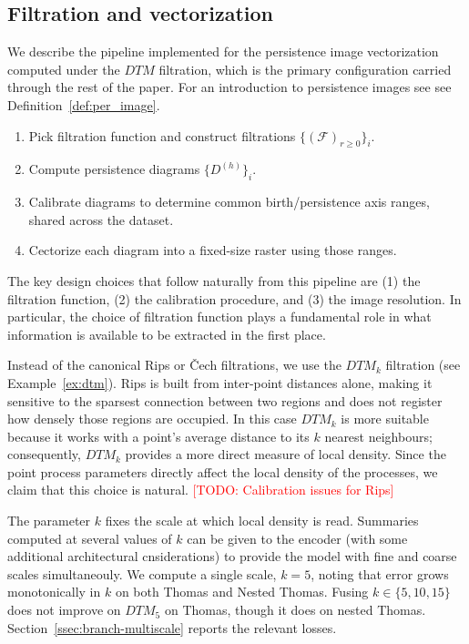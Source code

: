 \documentclass[11pt,letterpaper]{article}
\newcommand{\1}{\mathds{1}}
\newcommand{\filt}{\mathcal{F}}
\newcommand{\todo}[1]{\textcolor{red}{[TODO: #1]}}
\newcommand{\fix}[1]{\textcolor{blue}{[FIX: #1]}}
\newcommand{\todo}[1]{}\newcommand{\fix}[1]{}
\theoremstyle{plain}
\theoremstyle{definitioncolon}
\begin{document}
\subsection{Filtration and vectorization}
\label{ssec:filtration}

We describe the pipeline implemented for the
persistence image vectorization computed under the $DTM$ filtration, which is the primary
configuration carried through the rest of the paper. For an introduction to persistence
images see see Definition~\ref{def:per_image}.
    \begin{enumerate}
        \item Pick filtration function and construct filtrations
        $\{(\filt)_{r\geq 0}\}_i$.
        \item Compute persistence diagrams $\{D^{(h)}\}_i$.
        \item Calibrate diagrams to determine common birth/persistence axis
        ranges, shared across the dataset.
        \item Cectorize each diagram into a
        fixed-size raster using those ranges.
    \end{enumerate}
The key design choices that follow naturally from this pipeline are (1) the filtration function,
(2) the calibration procedure, and (3) the image resolution. In particular, the choice of filtration 
function plays a fundamental role in
what information is available to be extracted in the first place.

Instead of the canonical Rips or \v{C}ech filtrations, we use the $DTM_k$ filtration (see Example~\ref{ex:dtm}).
Rips is built from inter-point distances alone, making it sensitive to the
sparsest connection between two regions and does not register how densely those
regions are occupied. In this case $DTM_k$ is more suitable because it works with a point's average distance to its
$k$ nearest neighbours; consequently, $DTM_k$ provides a more direct measure of local density.
Since the point process parameters directly affect the local density of the processes,
we claim that this choice is natural. \todo{Calibration issues for Rips}

The parameter $k$ fixes the scale at which local density is read. Summaries
computed at several values of $k$ can be given to the encoder 
(with some additional architectural cnsiderations) to provide the model with fine and coarse
scales simultaneouly. We compute a single scale, $k=5$, noting that error grows
monotonically in $k$ on both Thomas and Nested Thomas. Fusing
$k \in \{5,10,15\}$ does not improve on $DTM_5$ on Thomas, though it does on
nested Thomas. Section~\ref{ssec:branch-multiscale} reports the relevant losses.
\end{document}
